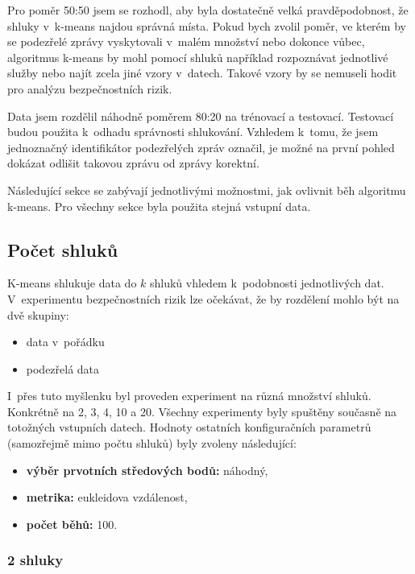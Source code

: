 \documentclass[thesis=M,czech]{FITthesis}[2012/10/20]
\begin{document}
		Pro poměr 50:50 jsem se rozhodl, aby byla dostatečně velká pravděpodobnost, že shluky v~k-means najdou správná místa. Pokud bych zvolil poměr, ve kterém by se podezřelé zprávy vyskytovali v~malém množství nebo dokonce vůbec, algoritmus k-means by mohl pomocí shluků například rozpoznávat jednotlivé služby nebo najít zcela jiné vzory v~datech. Takové vzory by se nemuseli hodit pro analýzu bezpečnostních rizik.
		
		Data jsem rozdělil náhodně poměrem 80:20 na trénovací a testovací. Testovací budou použita k~odhadu správnosti shlukování. Vzhledem k~tomu, že jsem jednoznačný identifikátor podezřelých zpráv označil, je možné na první pohled dokázat odlišit takovou zprávu od zprávy korektní.
		
		Následující sekce se zabývají jednotlivými možnostmi, jak ovlivnit běh algoritmu k-means. Pro všechny sekce byla použita stejná vstupní data.

		\subsection{Počet shluků}
			K-means shlukuje data do $k$ shluků vhledem k~podobnosti jednotlivých dat. V~experimentu bezpečnostních rizik lze očekávat, že by rozdělení mohlo být na dvě skupiny:
			
			\begin{itemize} 
				\item data v~pořádku
				\item podezřelá data		
			\end{itemize}
		
			I~přes tuto myšlenku byl proveden experiment na různá množství shluků. Konkrétně na 2, 3, 4, 10 a 20. Všechny experimenty byly spuštěny současně na totožných vstupních datech. Hodnoty ostatních konfiguračních parametrů (samozřejmě mimo počtu shluků) byly zvoleny následující:
			
			\begin{itemize} 
				\item \textbf{výběr prvotních středových bodů: } náhodný,
				\item \textbf{metrika: } eukleidova vzdálenost,
				\item \textbf{počet běhů: } 100.	
			\end{itemize}
				
				\subsubsection{2 shluky}
				
\end{document}
